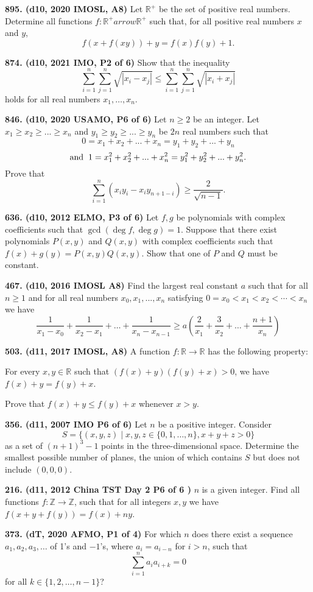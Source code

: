 \documentclass{article}
\begin{document}
\textbf{895. (\color{red}d10\color{black}, 2020 IMOSL, A8)} Let $\mathbb{R}^{+}$ be the set of positive real numbers. Determine all functions $f: \mathbb{R}^{+} arrow \mathbb{R}^{+}$ such that, for all positive real numbers $x$ and $y$,
$$
    f(x+f(x y))+y=f(x) f(y)+1 .
$$

\textbf{874. (\color{red}d10\color{black}, 2021 IMO, P2 of 6)} Show that the inequality
$$
    \sum_{i=1}^{n} \sum_{j=1}^{n} \sqrt{|x_{i}-x_{j}|} \leq \sum_{i=1}^{n} \sum_{j=1}^{n} \sqrt{|x_{i}+x_{j}|}
$$
holds for all real numbers $x_{1}, \ldots, x_{n}$.

\textbf{846. (\color{red}d10\color{black}, 2020 USAMO, P6 of 6)} Let $n \ge 2$ be an integer. Let $x_1 \ge x_2 \ge ... \ge x_n$ and $y_1 \ge y_2 \ge ... \ge y_n$ be $2n$ real numbers such that$$0 = x_1 + x_2 + ... + x_n = y_1 + y_2 + ... + y_n $$$$\text{and} \hspace{2mm} 1 =x_1^2 + x_2^2 + ... + x_n^2 = y_1^2 + y_2^2 + ... + y_n^2.$$Prove that$$\sum_{i = 1}^n (x_iy_i - x_iy_{n + 1 - i}) \ge \frac{2}{\sqrt{n-1}}.$$

\textbf{636. (\color{red}d10\color{black}, 2012 ELMO, P3 of 6)} Let $f,g$ be polynomials with complex coefficients such that $\gcd(\deg f,\deg g)=1$. Suppose that there exist polynomials $P(x,y)$ and $Q(x,y)$ with complex coefficients such that $f(x)+g(y)=P(x,y)Q(x,y)$. Show that one of $P$ and $Q$ must be constant.

\textbf{467. (\color{red}d10\color{black}, 2016 IMOSL A8)} Find the largest real constant $a$ such that for all $n \geq 1$ and for all real numbers $x_0, x_1, ... , x_n$ satisfying $0 = x_0 < x_1 < x_2 < \cdots < x_n$ we have
\[\frac{1}{x_1-x_0} + \frac{1}{x_2-x_1} + \dots + \frac{1}{x_n-x_{n-1}} \geq a ( \frac{2}{x_1} + \frac{3}{x_2} + \dots + \frac{n+1}{x_n} )\]

\textbf{503. (\color{red}d11\color{black}, 2017 IMOSL, A8)} A function $f:\mathbb{R} \to \mathbb{R}$ has the following property:

For every $x,y \in \mathbb{R}$ such that $(f(x)+y)(f(y)+x) > 0$, we have $f(x)+y = f(y)+x$.

Prove that $f(x)+y \leq f(y)+x$ whenever $x>y$.

\textbf{356. (\color{red}d11\color{black}, 2007 IMO P6 of 6)} Let $ n$ be a positive integer. Consider
\[ S = \{ (x,y,z) \mid x,y,z \in \{ 0, 1, \ldots, n\}, x + y + z > 0  \}
\]
as a set of $ (n + 1)^{3} - 1$ points in the three-dimensional space. Determine the smallest possible number of planes, the union of which contains $ S$ but does not include $ (0,0,0)$.

\textbf{216. (\color{red}d11\color{black}, 2012 China TST Day 2 P6 of 6 )} $n$ is a given integer. Find all functions $f\colon \mathbb{Z} \to \mathbb{Z}$, such that for all integers $x,y$ we have $f( {x + y + f(y)} ) = f(x) + ny$.

\textbf{373. (\color{red}dT\color{black}, 2020 AFMO, P1 of 4)} For which $n$ does there exist a sequence $a_1, a_2, a_3, \dots$ of 1's and \(-1\)'s, where \(a_i = a_{i-n}\) for \(i > n\), such that \[\sum_{i=1}^n a_ia_{i+k} = 0\] for all $k \in \{1, 2, \dots, n-1\}$?
\end{document}
